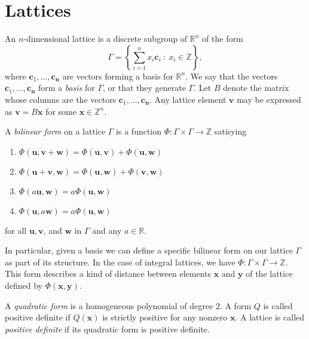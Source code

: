 
\section{Lattices}
\label{sec:Lattices}

An $n$-dimensional lattice is a discrete subgroup of $\mathbb{R}^n$ of the form
\[\Gamma = \left\{ \sum_{i=1}^n x_i \mathbf{c}_i \ : \ x_i \in \mathbb{Z} \right\},\]
where $\mathbf{c}_1, \dots, \mathbf{c_n}$ are vectors forming a basis for $\mathbb{R}^n$. We say that the vectors $\mathbf{c}_1, \dots, \mathbf{c_n}$ form a \textit{basis} for $\Gamma$, or that they generate $\Gamma$. Let $B$ denote the matrix whose columns are the vectors $\mathbf{c}_1, \dots, \mathbf{c_n}$. Any lattice element $\mathbf{v}$ may be expressed as $\mathbf{v} = B\mathbf{x}$ for some $\mathbf{x} \in \mathbb{Z}^n$. 

A \textit{bilinear form} on a lattice $\Gamma$ is a function $\Phi: \Gamma \times \Gamma \to \mathbb{Z}$ satisying
\begin{enumerate}
\item $\Phi(\mathbf{u}, \mathbf{v}+\mathbf{w}) = \Phi(\mathbf{u},\mathbf{v}) + \Phi(\mathbf{u},\mathbf{w})$
\item $\Phi(\mathbf{u}+\mathbf{v}, \mathbf{w}) = \Phi(\mathbf{u},\mathbf{w}) + \Phi(\mathbf{v},\mathbf{w})$
\item $\Phi(a\mathbf{u}, \mathbf{w}) = a\Phi(\mathbf{u},\mathbf{w})$
\item $\Phi(\mathbf{u}, a\mathbf{w}) = a\Phi(\mathbf{u},\mathbf{w})$
\end{enumerate}
for all $\mathbf{u}, \mathbf{v}$, and $\mathbf{w}$ in $\Gamma$ and any $a \in \mathbb{R}$. 

In particular, given a basis we can define a specific bilinear form on our lattice $\Gamma$ as part of its structure. In the case of integral lattices, we have $\Phi: \Gamma \times \Gamma \to \mathbb{Z}$. This form describes a kind of distance between elements $\mathbf{x}$ and $\mathbf{y}$ of the lattice defined by $\Phi(\mathbf{x},\mathbf{y})$. 

A \textit{quadratic form} is a homogeneous polynomial of degree $2$. A form $Q$ is called positive definite if $Q(\mathbf{x})$ is strictly positive for any nonzero $\mathbf{x}$. A lattice is called \textit{positive definite} if its quadratic form is positive definite. 

